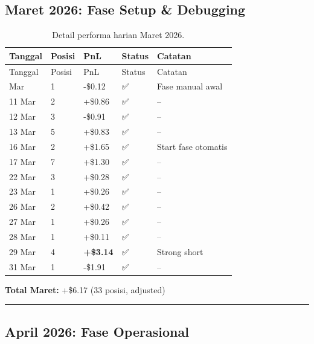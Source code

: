 \documentclass[
  11pt,
  a4paper,
]{article}
\begin{document}
\subsection{Maret 2026: Fase Setup \&
Debugging}\label{maret-2026-fase-setup-debugging}

\begin{longtable}[]{@{}lllll@{}}
\caption{Detail performa harian Maret
2026.}\label{tbl-march}\tabularnewline
\toprule\noalign{}
Tanggal & Posisi & PnL & Status & Catatan \\
\midrule\noalign{}
\endfirsthead
\toprule\noalign{}
Tanggal & Posisi & PnL & Status & Catatan \\
\midrule\noalign{}
\endhead
\bottomrule\noalign{}
\endlastfoot
10 Mar & 1 & -\$0.12 & ✅ & Fase manual awal \\
11 Mar & 2 & +\$0.86 & ✅ & -- \\
12 Mar & 3 & -\$0.91 & ✅ & -- \\
13 Mar & 5 & +\$0.83 & ✅ & -- \\
16 Mar & 2 & +\$1.65 & ✅ & Start fase otomatis \\
17 Mar & 7 & +\$1.30 & ✅ & -- \\
22 Mar & 3 & +\$0.28 & ✅ & -- \\
23 Mar & 1 & +\$0.26 & ✅ & -- \\
26 Mar & 2 & +\$0.42 & ✅ & -- \\
27 Mar & 1 & +\$0.26 & ✅ & -- \\
28 Mar & 1 & +\$0.11 & ✅ & -- \\
29 Mar & 4 & \textbf{+\$3.14} & ✅ & Strong short \\
31 Mar & 1 & -\$1.91 & ✅ & -- \\
\end{longtable}

\textbf{Total Maret:} +\$6.17 (33 posisi, adjusted)

\begin{center}\rule{0.5\linewidth}{0.5pt}\end{center}

\subsection{April 2026: Fase
Operasional}\label{april-2026-fase-operasional}
\end{document}
